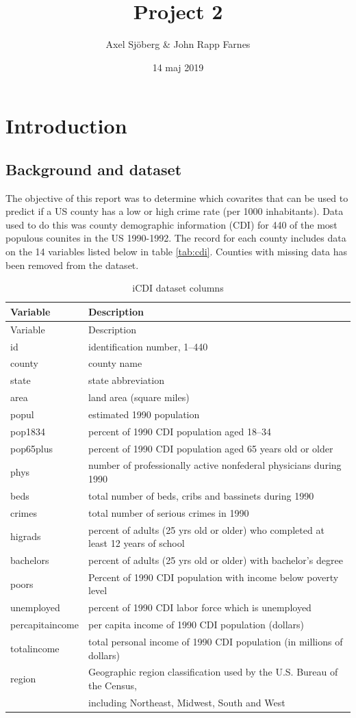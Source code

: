 \documentclass[a4paper]{article}
\title{Project 2}
\author{Axel Sjöberg \& John Rapp Farnes}
\date{14 maj 2019}
\begin{document}
\maketitle

{
\setcounter{tocdepth}{3}
\tableofcontents
}
\newpage

\hypertarget{introduction}{%
\section{Introduction}\label{introduction}}

\hypertarget{background-and-dataset}{%
\subsection{Background and dataset}\label{background-and-dataset}}

The objective of this report was to determine which covarites that can
be used to predict if a US county has a low or high crime rate (per 1000
inhabitants). Data used to do this was county demographic information
(CDI) for 440 of the most populous counites in the US 1990-1992. The
record for each county includes data on the 14 variables listed below in
table \ref{tab:cdi}. Counties with missing data has been removed from
the dataset.

\begin{longtable}[]{@{}ll@{}}
\caption{\label{tab:cd}iCDI dataset columns}\tabularnewline
\toprule
Variable & Description\tabularnewline
\midrule
\endfirsthead
\toprule
Variable & Description\tabularnewline
\midrule
\endhead
id & identification number, 1--440\tabularnewline
county & county name\tabularnewline
state & state abbreviation\tabularnewline
area & land area (square miles)\tabularnewline
popul & estimated 1990 population\tabularnewline
pop1834 & percent of 1990 CDI population aged 18--34\tabularnewline
pop65plus & percent of 1990 CDI population aged 65 years old or
older\tabularnewline
phys & number of professionally active nonfederal physicians during
1990\tabularnewline
beds & total number of beds, cribs and bassinets during
1990\tabularnewline
crimes & total number of serious crimes in 1990\tabularnewline
higrads & percent of adults (25 yrs old or older) who completed at least
12 years of school\tabularnewline
bachelors & percent of adults (25 yrs old or older) with bachelor's
degree\tabularnewline
poors & Percent of 1990 CDI population with income below poverty
level\tabularnewline
unemployed & percent of 1990 CDI labor force which is
unemployed\tabularnewline
percapitaincome & per capita income of 1990 CDI population
(dollars)\tabularnewline
totalincome & total personal income of 1990 CDI population (in millions
of dollars)\tabularnewline
region & Geographic region classification used by the U.S. Bureau of the
Census,\tabularnewline
& including Northeast, Midwest, South and West\tabularnewline
\bottomrule
\end{longtable}
\end{document}
